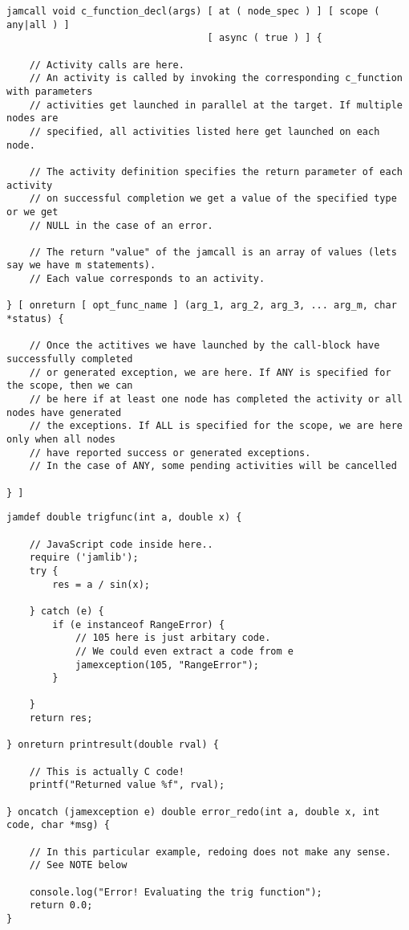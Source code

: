 \documentclass[11pt]{article}
\begin{document}
\begin{lstlisting}[caption=Syntax of the activity control construct, label=activity_control]
jamcall void c_function_decl(args) [ at ( node_spec ) ] [ scope ( any|all ) ]
                                   [ async ( true ) ] {

    // Activity calls are here.
    // An activity is called by invoking the corresponding c_function with parameters
    // activities get launched in parallel at the target. If multiple nodes are
    // specified, all activities listed here get launched on each node.

    // The activity definition specifies the return parameter of each activity
    // on successful completion we get a value of the specified type or we get
    // NULL in the case of an error.

    // The return "value" of the jamcall is an array of values (lets say we have m statements).
    // Each value corresponds to an activity.

} [ onreturn [ opt_func_name ] (arg_1, arg_2, arg_3, ... arg_m, char *status) {

    // Once the actitives we have launched by the call-block have successfully completed
    // or generated exception, we are here. If ANY is specified for the scope, then we can
    // be here if at least one node has completed the activity or all nodes have generated
    // the exceptions. If ALL is specified for the scope, we are here only when all nodes
    // have reported success or generated exceptions.
    // In the case of ANY, some pending activities will be cancelled

} ]
\end{lstlisting}




\begin{lstlisting}[caption=An activity definition example,label=lst2]
jamdef double trigfunc(int a, double x) {

    // JavaScript code inside here..
    require ('jamlib');
    try {
        res = a / sin(x);

    } catch (e) {
        if (e instanceof RangeError) {
            // 105 here is just arbitary code.
            // We could even extract a code from e
            jamexception(105, "RangeError");
        }

    }
    return res;

} onreturn printresult(double rval) {

    // This is actually C code!
    printf("Returned value %f", rval);

} oncatch (jamexception e) double error_redo(int a, double x, int code, char *msg) {

    // In this particular example, redoing does not make any sense.
    // See NOTE below

    console.log("Error! Evaluating the trig function");
    return 0.0;
}
\end{lstlisting}
\end{document}
